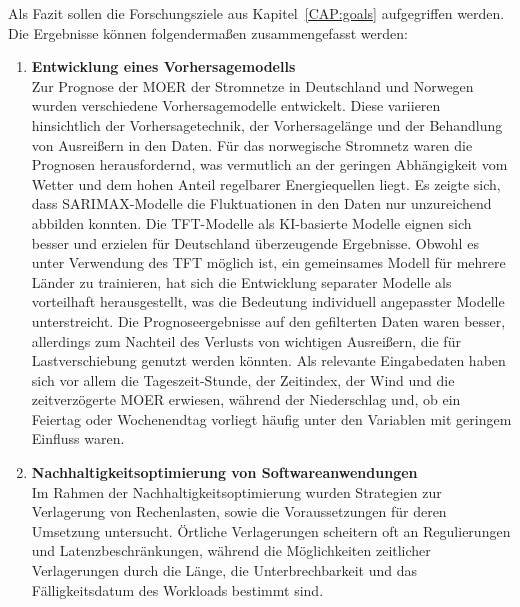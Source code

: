 

Als Fazit sollen die Forschungsziele aus Kapitel~\ref{CAP:goals} aufgegriffen werden.
Die Ergebnisse können folgendermaßen zusammengefasst werden:
\begin{enumerate}
 \item \textbf{Entwicklung eines Vorhersagemodells} \\
 Zur Prognose der \ac{MOER} der Stromnetze in Deutschland und Norwegen wurden verschiedene Vorhersagemodelle entwickelt.
 Diese variieren hinsichtlich der Vorhersagetechnik, der Vorhersagelänge und der Behandlung von Ausreißern in den Daten.
 Für das norwegische Stromnetz waren die Prognosen herausfordernd, was vermutlich an der geringen Abhängigkeit vom Wetter und dem hohen Anteil regelbarer Energiequellen liegt.
 Es zeigte sich, dass \ac{SARIMAX}-Modelle die Fluktuationen in den Daten nur unzureichend abbilden konnten.
 Die \ac{TFT}-Modelle als \ac{KI}-basierte Modelle eignen sich besser und erzielen für Deutschland überzeugende Ergebnisse.
 Obwohl es unter Verwendung des \ac{TFT} möglich ist, ein gemeinsames Modell für mehrere Länder zu trainieren, hat sich die Entwicklung separater Modelle als vorteilhaft herausgestellt, was die Bedeutung individuell angepasster Modelle unterstreicht.
 Die Prognoseergebnisse auf den gefilterten Daten waren besser, allerdings zum Nachteil des Verlusts von wichtigen Ausreißern, die für Lastverschiebung genutzt werden könnten.
 Als relevante Eingabedaten haben sich vor allem die Tageszeit-Stunde, der Zeitindex, der Wind und die zeitverzögerte \ac{MOER} erwiesen, während der Niederschlag und, ob ein Feiertag oder Wochenendtag vorliegt häufig unter den Variablen mit geringem Einfluss waren.
 \item \textbf{Nachhaltigkeitsoptimierung von Softwareanwendungen} \\
 Im Rahmen der Nachhaltigkeitsoptimierung wurden Strategien zur Verlagerung von Rechenlasten, sowie die Voraussetzungen für deren Umsetzung untersucht.
 Örtliche Verlagerungen scheitern oft an Regulierungen und Latenzbeschränkungen, während die Möglichkeiten zeitlicher Verlagerungen durch die Länge, die Unterbrechbarkeit und das Fälligkeitsdatum des Workloads bestimmt sind.

\end{enumerate}
